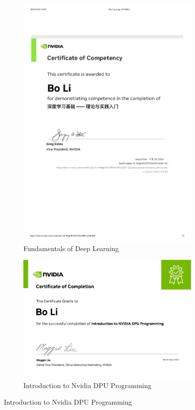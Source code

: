 \documentclass[12pt]{article}
\begin{document}
\begin{figure}[H]
	\small
	\centering
	\begin{subfigure}[b]{0.4\textwidth}
		\includegraphics[width=\linewidth]{Bo_Li_FDL_Certification.pdf}
		\caption{Fundamentals of Deep Learning}
	\end{subfigure}
	\hfill
	\begin{subfigure}[b]{0.4\textwidth}
		\includegraphics[width=\linewidth]{Bo_Li_INDP_Certification.pdf}
		\caption{Introduction to Nvidia DPU Programming}
	\end{subfigure}
	

\end{figure}
\end{document}
